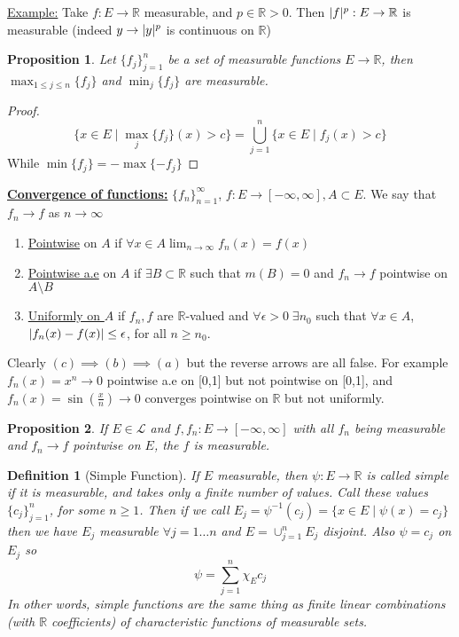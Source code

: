 \documentclass[11pt]{article}
\DeclarePairedDelimiter{\card}{\lvert}{\rvert}
\newtheorem*{prop}{Proposition}
\newtheorem{definition}{Definition}[section]
\newcommand{\R}{\mathbb{R}}
\newcommand{\Le}{\mathcal{L}}
\begin{document}
    \underline{Example:} Take $f: E \rightarrow \R$ measurable, and $p \in \R > 0$.
    Then $\card{f}^p: E \rightarrow \R$ is measurable (indeed $y \rightarrow \card{y}^p$ is continuous on $\R$)

    \begin{prop}
        Let $\{ f_j \}_{j=1}^{n}$ be a set of measurable functions $E \rightarrow \R$, then $\max_{1 \leq j \leq n} \{ f_j \}$ and $\min_{j} \{ f_j \}$ are measurable.
    \end{prop}
    \begin{proof}
        \[
            \{ x \in E \mid \max_{j} \{ f_j \} (x) > c \} = \bigcup_{j=1}^{n} \{ x \in E \mid f_j (x) > c \}
        \]
        While $\min \{f_j \} = - \max \{ -f_j \}$
    \end{proof}

    \textbf{\underline{Convergence of functions:}} $\{ f_n \}_{n=1}^{\infty}$, $f: E \rightarrow [-\infty, \infty], A \subset E$.
    We say that $f_n \rightarrow f$ as $n \rightarrow \infty$
    \begin{enumerate}
        \item \underline{Pointwise} on $A$ if $\forall x \in A \lim_{n \rightarrow \infty} f_n (x) = f(x)$
        \item \underline{Pointwise a.e} on $A$ if $\exists B \subset \R$ such that $m(B) = 0$ and $f_n \rightarrow f$ pointwise on $A \setminus B$
        \item \underline{Uniformly on $A$} if $f_n, f$ are $\R$-valued and $\forall \epsilon > 0 \; \exists n_0$ such that $\forall x \in A$, $\card{f_n(x) - f(x)} \leq \epsilon$, for all $n \geq n_0$.
    \end{enumerate}

    Clearly $(c) \implies (b) \implies (a)$ but the reverse arrows are all false.
    For example $f_n (x) = x^n \rightarrow 0$ pointwise a.e on [0,1] but not pointwise on [0,1], and $f_n (x) = \sin(\frac{x}{n}) \rightarrow 0$ converges pointwise on $\R$ but not uniformly.

    \begin{prop}
        If $E \in \Le$ and $f,f_n: E \rightarrow [-\infty, \infty]$ with all $f_n$ being measurable and $f_n \rightarrow f$ pointwise on $E$, the $f$ is measurable.
    \end{prop}

    \begin{definition}[Simple Function]
        If $E$ measurable, then $\psi: E \rightarrow \R$ is called simple if it  is measurable, and takes only a finite number of values.
        Call these values $\{ c_j\}_{j=1}^{n}$, for some $n \geq 1$.
        Then if we call $E_j = \psi^{-1} (c_j) = \{ x \in E \mid \psi(x) = c_j \}$ then we have $E_j$ measurable $\forall j = 1 \hdots n$ and $E = \cup_{j=1}^{n} E_j$ disjoint.
        Also $\psi = c_j$ on $E_j$ so
        \[
            \boxed{\psi = \sum_{j=1}^{n} \chi_E c_j}
        \]
        In other words, simple functions are the same thing as finite linear combinations (with $\R$ coefficients) of characteristic functions of measurable sets.
    \end{definition}
\end{document}
